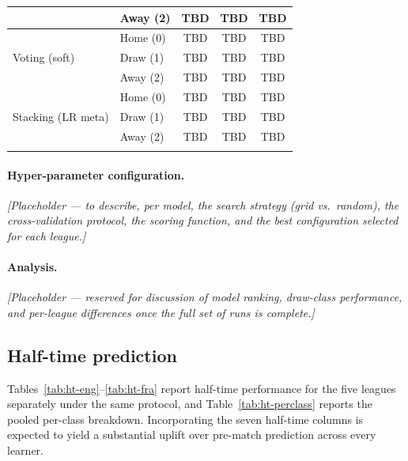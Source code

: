 \documentclass[pdflatex,sn-mathphys-num]{sn-jnl}
\theoremstyle{thmstyleone}
\theoremstyle{thmstyletwo}
\theoremstyle{thmstylethree}
\begin{document}
\begin{table}[h]
\begin{tabular*}{\textwidth}{@{\extracolsep\fill}llccc@{}}
                                     & Away (2) & TBD & TBD & TBD \\
\midrule
\multirow{3}{*}{Voting (soft)}       & Home (0) & TBD & TBD & TBD \\
                                     & Draw (1) & TBD & TBD & TBD \\
                                     & Away (2) & TBD & TBD & TBD \\
\midrule
\multirow{3}{*}{Stacking (LR meta)}  & Home (0) & TBD & TBD & TBD \\
                                     & Draw (1) & TBD & TBD & TBD \\
                                     & Away (2) & TBD & TBD & TBD \\
\botrule
\end{tabular*}
\end{table}

\paragraph{Hyper-parameter configuration.}
\emph{[Placeholder --- to describe, per model, the search strategy
(grid vs.\ random), the cross-validation protocol, the scoring
function, and the best configuration selected for each league.]}

\paragraph{Analysis.}
\emph{[Placeholder --- reserved for discussion of model ranking,
draw-class performance, and per-league differences once the full
set of runs is complete.]}

\subsection{Half-time prediction}\label{subsec:res-ht}

Tables~\ref{tab:ht-eng}--\ref{tab:ht-fra} report half-time
performance for the five leagues separately under the same protocol,
and Table~\ref{tab:ht-perclass} reports the pooled per-class
breakdown. Incorporating the seven half-time columns is expected to
yield a substantial uplift over pre-match prediction across every
learner.
\end{document}
